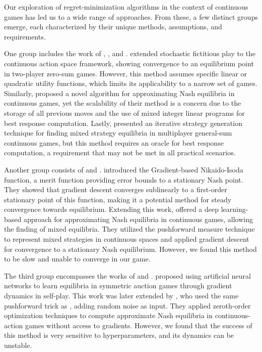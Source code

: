 \documentclass[preprint,12pt,authoryear]{elsarticle}
\theoremstyle{definition}
\begin{document}
Our exploration of regret-minimization algorithms in the context of continuous games has led us to a wide range of approaches. From these, a few distinct groups emerge, each characterized by their unique methods, assumptions, and requirements.

One group includes the work of \citet{perkins2014stochastic}, \citet{ganzfried2021algorithm}, and \citet{kroupa2023multiple}. \citet{perkins2014stochastic} extended stochastic fictitious play to the continuous action space framework, showing convergence to an equilibrium point in two-player zero-sum games. However, this method assumes specific linear or quadratic utility functions, which limits its applicability to a narrow set of games. Similarly, \citet{ganzfried2021algorithm} proposed a novel algorithm for approximating Nash equilibria in continuous games, yet the scalability of their method is a concern due to the storage of all previous moves and the use of mixed integer linear programs for best response computation. Lastly, \citet{kroupa2023multiple} presented an iterative strategy generation technique for finding mixed strategy equilibria in multiplayer general-sum continuous games, but this method requires an oracle for best response computation, a requirement that may not be met in all practical scenarios.

Another group consists of \citet{raghunathan2019game} and \citet{dou2019finding}. \citet{raghunathan2019game} introduced the Gradient-based Nikaido-Isoda function, a merit function providing error bounds to a stationary Nash point. They showed that gradient descent converges sublinearly to a first-order stationary point of this function, making it a potential method for steady convergence towards equilibrium. Extending this work, \citet{dou2019finding} offered a deep learning-based approach for approximating Nash equilibria in continuous games, allowing the finding of mixed equilibria. They utilized the pushforward measure technique to represent mixed strategies in continuous spaces and applied gradient descent for convergence to a stationary Nash equilibrium. However, we found this method to be slow and unable to converge in our game.

The third group encompasses the works of \citet{bichler2021learning} and \citet{martin2022finding}. \citet{bichler2021learning} proposed using artificial neural networks to learn equilibria in symmetric auction games through gradient dynamics in self-play. This work was later extended by \citet{martin2022finding}, who used the same pushforward trick as \citet{dou2019finding}, adding random noise as input. They applied zeroth-order optimization techniques to compute approximate Nash equilibria in continuous-action games without access to gradients. However, we found that the success of this method is very sensitive to hyperparameters, and its dynamics can be unstable.
\end{document}
